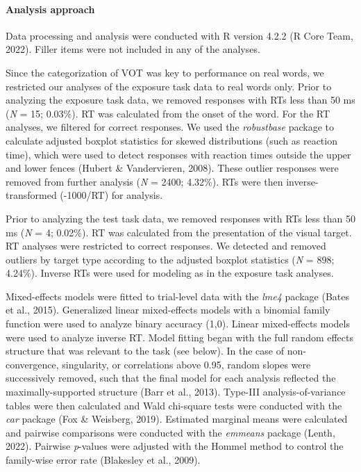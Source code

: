 \documentclass[
  12pt,
  twoside]{article}
\begin{document}
\hypertarget{methods-analysis-1a}{%
\paragraph{Analysis approach}\label{methods-analysis-1a}}

Data processing and analysis were conducted with R version 4.2.2 (R Core Team, 2022).
Filler items were not included in any of the analyses.

Since the categorization of VOT was key to performance on real words, we restricted our analyses of the exposure task data to real words only.
Prior to analyzing the exposure task data, we removed responses with RTs less than 50 ms (\emph{N} = 15; 0.03\%).
RT was calculated from the onset of the word.
For the RT analyses, we filtered for correct responses.
We used the \emph{robustbase} package to calculate adjusted boxplot statistics for skewed distributions (such as reaction time), which were used to detect responses with reaction times outside the upper and lower fences (Hubert \& Vandervieren, 2008).
These outlier responses were removed from further analysis (\emph{N} = 2400; 4.32\%).
RTs were then inverse-transformed (-1000/RT) for analysis.

Prior to analyzing the test task data, we removed responses with RTs less than 50 ms (\emph{N} = 4; 0.02\%).
RT was calculated from the presentation of the visual target.
RT analyses were restricted to correct responses.
We detected and removed outliers by target type according to the adjusted boxplot statistics (\emph{N} = 898; 4.24\%).
Inverse RTs were used for modeling as in the exposure task analyses.

Mixed-effects models were fitted to trial-level data with the \emph{lme4} package (Bates et al., 2015).
Generalized linear mixed-effects models with a binomial family function were used to analyze binary accuracy (1,0).
Linear mixed-effects models were used to analyze inverse RT.
Model fitting began with the full random effects structure that was relevant to the task (see below).
In the case of non-convergence, singularity, or correlations above 0.95, random slopes were successively removed, such that the final model for each analysis reflected the maximally-supported structure (Barr et al., 2013).
Type-III analysis-of-variance tables were then calculated and Wald chi-square tests were conducted with the \emph{car} package (Fox \& Weisberg, 2019).
Estimated marginal means were calculated and pairwise comparisons were conducted with the \emph{emmeans} package (Lenth, 2022).
Pairwise \emph{p}-values were adjusted with the Hommel method to control the family-wise error rate (Blakesley et al., 2009).
\end{document}
